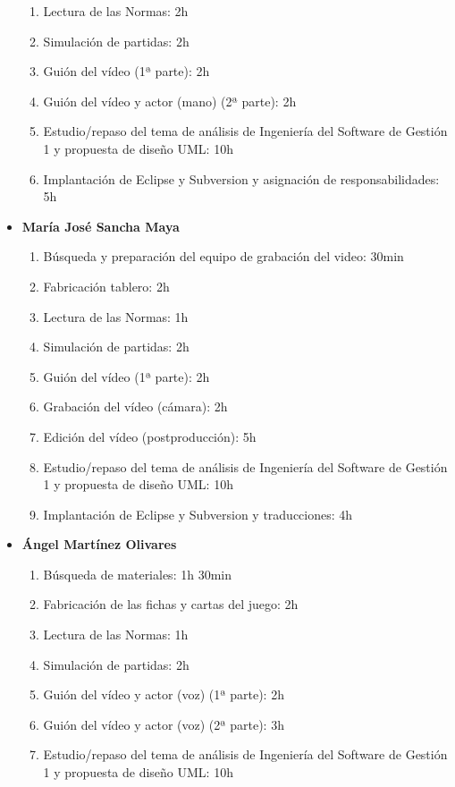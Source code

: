 \documentclass[11 pt]{book}
\begin{document}
\begin{itemize}
				\begin{enumerate}
					\item Lectura de las Normas: 2h
					\item Simulación de partidas: 2h
					\item Guión del vídeo (1ª parte): 2h
					\item Guión del vídeo y actor (mano) (2ª parte): 2h
					\item Estudio/repaso del tema de análisis de Ingeniería del Software de Gestión 1 y propuesta de diseño UML: 10h
					\item Implantación de Eclipse y Subversion y asignación de responsabilidades: 5h
				\end{enumerate}
			\item \textbf {María José Sancha Maya}
				\begin{enumerate}
					\item Búsqueda y preparación del equipo de grabación del video: 30min
					\item Fabricación tablero: 2h
					\item Lectura de las Normas: 1h
					\item Simulación de partidas: 2h
					\item Guión del vídeo (1ª parte): 2h
					\item Grabación del vídeo (cámara): 2h
					\item Edición del vídeo (postproducción): 5h
					\item Estudio/repaso del tema de análisis de Ingeniería del Software de Gestión 1 y propuesta de diseño UML: 10h
					\item Implantación de Eclipse y Subversion y traducciones: 4h
				\end{enumerate}
			\item \textbf {Ángel Martínez Olivares}
				\begin{enumerate}
					\item Búsqueda de materiales: 1h 30min
					\item Fabricación de las fichas y cartas del juego: 2h
					\item Lectura de las Normas: 1h
					\item Simulación de partidas: 2h
					\item Guión del vídeo y actor (voz) (1ª parte): 2h
					\item Guión del vídeo y actor (voz) (2ª parte): 3h
					\item Estudio/repaso del tema de análisis de Ingeniería del Software de Gestión 1 y propuesta de diseño UML: 10h

\end{enumerate}
\end{itemize}
\end{document}
